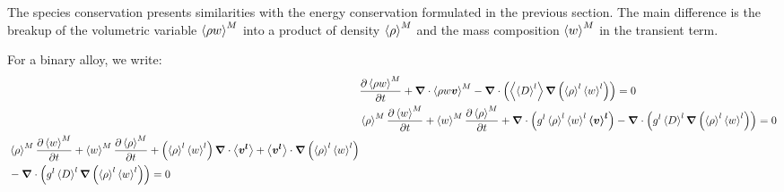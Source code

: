 The species conservation presents similarities with the energy conservation formulated in the previous section. 
The main difference is the breakup of the volumetric variable $\left \langle \rho w \right \rangle^M$ into a product of 
density  $\left \langle \rho \right \rangle^M$ and the mass composition $\left \langle w \right \rangle^M$ in the transient term.

For a binary alloy, we write:
\begin{subequations}
\begin{align}
 & \tempup{\avg{\rho w}^M} + \nabvec \cdot \avg{\rho w \vec{v}}^M - \nabvec  \cdot \brac{\avg{\Dl} \nabvec \brac{\rhol \wl} } = 0 \\
 & \avg{\rho}^M \tempup{\avg{w}^M} + \avg{w}^M \tempup{\avg{\rho}^M} 
	+ \nabvec \cdot \brac{\gl \rhol \wl \vl} 
	- \nabvec \cdot \brac{\gl \Dl \nabvec \brac{\rhol \wl} } = 0 \\
 \label{eq:species_1}
  \begin{split}
	& \avg{\rho}^M \tempup{\avg{w}^M} + \avg{w}^M \tempup{\avg{\rho}^M} 
	+ \brac{\rhol \wl} \nabvec \cdot \vit + \vit \cdot \nabvec \brac{\rhol \wl} \\
	& - \nabvec \cdot \brac{\gl \Dl \nabvec \brac{\rhol \wl} } = 0 
  \end{split}
%
\end{align}
\end{subequations}

